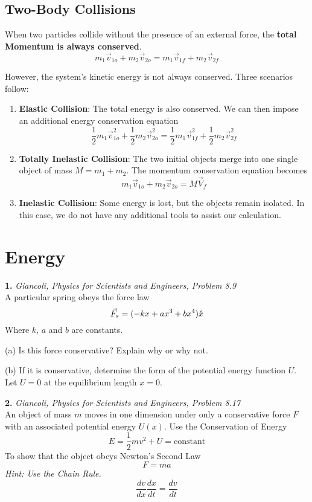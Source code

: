 \documentclass[11pt]{article}
\theoremstyle{gangnamstyle}{\newtheorem{definition}{Definition}[]}
\theoremstyle{gangnamstyle}{\newtheorem{example}{Example}[]}
\theoremstyle{gangnamstyle}{\newtheorem{problem}{Problem}[]}
\begin{document}
\subsection{Two-Body Collisions}

When two particles collide without the presence of an external force, the \textbf{total Momentum is always conserved}. 
\[ m_1\Vec{v}_{1o} + m_2\Vec{v}_{2o} = m_1\Vec{v}_{1f} + m_2\Vec{v}_{2f} \]

However, the system's kinetic energy is not always conserved. Three scenarios follow:
\begin{enumerate}
\item \textbf{Elastic Collision}: The total energy is also conserved. We can then impose an additional energy conservation equation
\[ \frac{1}{2}m_1\Vec{v}_{1o}^2 + \frac{1}{2}m_2\Vec{v}_{2o}^2 = \frac{1}{2}m_1\Vec{v}_{1f}^2 + \frac{1}{2}m_2\Vec{v}_{2f}^2 \]

\item \textbf{Totally Inelastic Collision}: The two initial objects merge into one single object of mass $M = m_1 + m_2$. The momentum conservation equation becomes
\[ m_1\Vec{v}_{1o} + m_2\Vec{v}_{2o} = M\Vec{V}_f \]
\item \textbf{Inelastic Collision}: Some energy is lost, but the objects remain isolated. In this case, we do not have any additional tools to assist our calculation. 
\end{enumerate}

\section{Energy}

\textbf{1.} \textit{Giancoli, Physics for Scientists and Engineers, Problem 8.9} \\
A particular spring obeys the force law 
\[ \Vec{F}_s = (-kx + ax^3 + bx^4) \Hat{x} \]
Where $k$, $a$ and $b$ are constants.

(a) Is this force conservative? Explain why or why not.

(b) If it is conservative, determine the form of the potential energy function $U$. Let $U = 0$ at the equilibrium length $x = 0$. 

\pagebreak

\textbf{2.} \textit{Giancoli, Physics for Scientists and Engineers, Problem 8.17} \\
An object of mass $m$ moves in one dimension under only a conservative force $F$ with an associated potential energy $U(x)$. Use the Conservation of Energy
\[ E = \frac{1}{2}mv^2 + U = \text{constant} \]
To show that the object obeys Newton's Second Law
\[ F = ma \]
\textit{Hint: Use the Chain Rule. }
\[ \frac{dv}{dx}\frac{dx}{dt} = \frac{dv}{dt} \]
\end{document}
